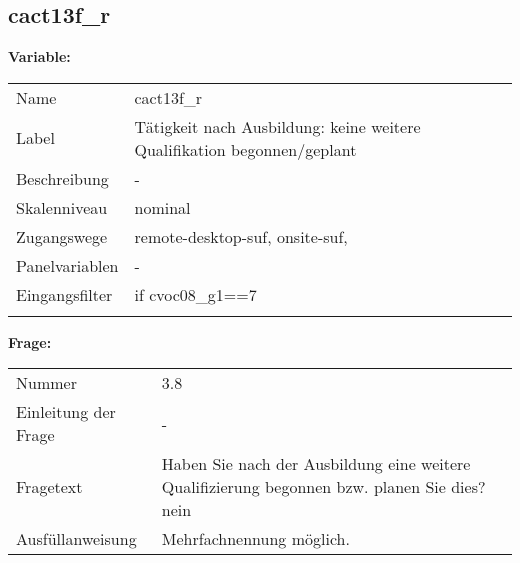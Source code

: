 	
	
	\subsection{cact13f\_r}
	\label{subSection:cact13f_r}

	\noindent\textbf{Variable:}\\
		\begin{tabular}{lL{11.3cm}}
			\label{tableVariable:cact13f_r}
			Name & cact13f\_r \\
			Label & Tätigkeit nach Ausbildung: keine weitere Qualifikation begonnen/geplant \\
			Beschreibung & - \\
			Skalenniveau & nominal \\
			Zugangswege &
				remote-desktop-suf,
				onsite-suf,
 \\
			Panelvariablen & -
			 \\
			Eingangsfilter & if cvoc08\_g1==7 \\
 \\
		\end{tabular}

		\vspace*{1 cm}
		\noindent\textbf{Frage:}\\
		\begin{tabular}{lL{11.3cm}}
			\label{tableQuestion:cact13f_r}
			Nummer & 3.8 \\
			Einleitung der Frage & - \\
			Fragetext & Haben Sie nach der Ausbildung eine weitere Qualifizierung begonnen bzw. planen Sie dies?
nein \\
			Ausfüllanweisung & Mehrfachnennung möglich. \\
		\end{tabular}





